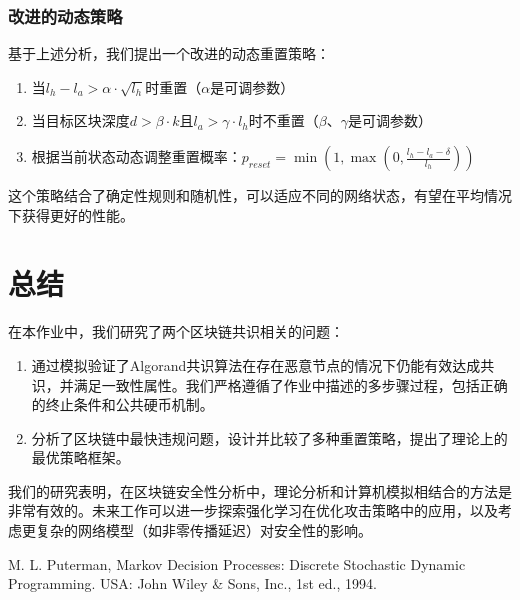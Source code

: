 \documentclass[12pt,a4paper]{article}
\begin{document}
\begin{CJK}{UTF8}{gbsn}
\subsubsection{改进的动态策略}

基于上述分析，我们提出一个改进的动态重置策略：

\begin{enumerate}
    \item 当$l_h - l_a > \alpha \cdot \sqrt{l_h}$时重置（$\alpha$是可调参数）
    \item 当目标区块深度$d > \beta \cdot k$且$l_a > \gamma \cdot l_h$时不重置（$\beta$、$\gamma$是可调参数）
    \item 根据当前状态动态调整重置概率：$p_{reset} = \min(1, \max(0, \frac{l_h - l_a - \delta}{l_h}))$
\end{enumerate}

这个策略结合了确定性规则和随机性，可以适应不同的网络状态，有望在平均情况下获得更好的性能。

\section{总结}

在本作业中，我们研究了两个区块链共识相关的问题：

\begin{enumerate}
    \item 通过模拟验证了Algorand共识算法在存在恶意节点的情况下仍能有效达成共识，并满足一致性属性。我们严格遵循了作业中描述的多步骤过程，包括正确的终止条件和公共硬币机制。
    \item 分析了区块链中最快违规问题，设计并比较了多种重置策略，提出了理论上的最优策略框架。
\end{enumerate}

我们的研究表明，在区块链安全性分析中，理论分析和计算机模拟相结合的方法是非常有效的。未来工作可以进一步探索强化学习在优化攻击策略中的应用，以及考虑更复杂的网络模型（如非零传播延迟）对安全性的影响。

\begin{thebibliography}{9}
M. L. Puterman, Markov Decision Processes: Discrete Stochastic Dynamic Programming. USA: John Wiley \& Sons, Inc., 1st ed., 1994.
\end{thebibliography}

\end{CJK}
\end{document}
